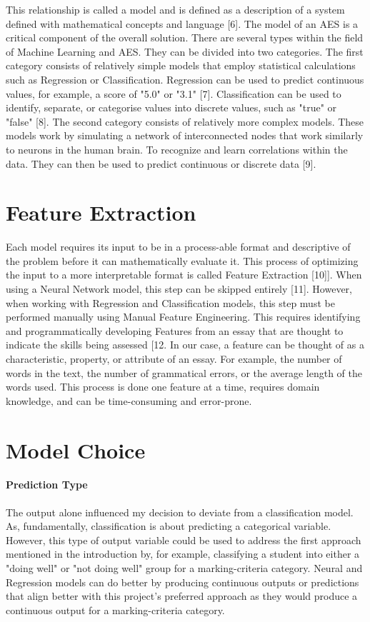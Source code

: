 This relationship is called a model and is defined as a description of a system defined with mathematical concepts and language [6]. The model of an AES is a critical component of the overall solution. There are several types within the field of Machine Learning and AES. They can be divided into two categories. The first category consists of relatively simple models that employ statistical calculations such as Regression or Classification. Regression can be used to predict continuous values, for example, a score of "5.0" or "3.1" [7]. Classification can be used to identify, separate, or categorise values into discrete values, such as "true" or "false" [8]. The second category consists of relatively more complex models. These models work by simulating a network of interconnected nodes that work similarly to neurons in the human brain. To recognize and learn correlations within the data. They can then be used to predict continuous or discrete data [9].

\section{Feature Extraction}

Each model requires its input to be in a process-able format and descriptive of the problem before it can mathematically evaluate it. This process of optimizing the input to a more interpretable format is called Feature Extraction [10]]. When using a Neural Network model, this step can be skipped entirely [11]. However, when working with Regression and Classification models, this step must be performed manually using Manual Feature Engineering. This requires identifying and programmatically developing Features from an essay that are thought to indicate the skills being assessed [12. In our case, a feature can be thought of as a characteristic, property, or attribute of an essay. For example, the number of words in the text, the number of grammatical errors, or the average length of the words used. This process is done one feature at a time, requires domain knowledge, and can be time-consuming and error-prone. 

\section{Model Choice}

\paragraph{Prediction Type}
The output alone influenced my decision to deviate from a classification model. As, fundamentally, classification is about predicting a categorical variable. However, this type of output variable could be used to address the first approach mentioned in the introduction by, for example, classifying a student into either a "doing well" or "not doing well" group for a marking-criteria category. Neural and Regression models can do better by producing continuous outputs or predictions that align better with this project's preferred approach as they would produce a continuous output for a marking-criteria category.  

